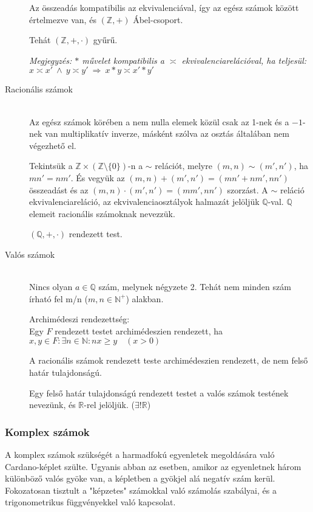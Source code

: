 \documentclass[margin=0px]{article}
\newcommand{\N}{\mathbb{N}}
\newcommand{\Z}{\mathbb{Z}}
\newcommand{\R}{\mathbb{R}}
\newcommand{\Q}{\mathbb{Q}}
\begin{document}
\begin{description}
        Az összeadás kompatibilis az ekvivalenciával, így az egész számok között értelmezve van, és $(\Z, +)$ Ábel-csoport.

        Tehát $(\Z, +, \cdot)$ gyűrű.

        \textit{Megjegyzés: $*$ művelet kompatibilis a $\asymp$ ekvivalenciarelációval, ha teljesül: $ x \asymp x' \ \land \ y \asymp y' \ \Longrightarrow \ x * y \asymp x'*y'$}
    \item[Racionális számok] \hfill \\
        Az egész számok körében a nem nulla elemek közül csak az 1-nek és a $-1$-nek van multiplikatív inverze, másként szólva az osztás általában nem végezhető el.

        Tekintsük a $\Z \times (\Z\setminus\{0\})$-n a $\sim$ relációt, melyre $(m,n) \sim (m',n')$, ha $mn' = nm'$. És vegyük az $(m,n)+(m',n') = (mn'+nm', nn')$ összeadást és az $(m,n)\cdot(m',n')=(mm', nn')$ szorzást. A $\sim$ reláció ekvivalenciareláció, az ekvivalenciaosztályok halmazát jelöljük $\Q$-val. $\Q$ elemeit racionális számoknak nevezzük.

        $(\Q, +, \cdot)$ rendezett test.
    \item[Valós számok] \hfill \\
        Nincs olyan $a \in \Q$ szám, melynek négyzete 2. Tehát nem minden szám írható fel m/n ($m,n \in \N^+$) alakban.

        Archimédeszi rendezettség:\\
        Egy $F$ rendezett testet archimédeszien rendezett, ha $x,y\in F: \exists n \in \N : nx \geq y \quad (x>0)$

        A racionális számok rendezett teste archimédeszien rendezett, de nem felső határ tulajdonságú.

        Egy felső határ tulajdonságú rendezett testet a valós számok testének nevezünk, és $\R$-rel jelöljük. ($\exists!\R$)
\end{description}
\subsubsection{Komplex számok}
A komplex számok szükségét a harmadfokú egyenletek megoldására való Cardano-képlet szülte. Ugyanis abban az esetben, amikor az egyenletnek három különböző valós gyöke van, a képletben a gyökjel alá negatív szám kerül. Fokozatosan tisztult a "képzetes" számokkal való számolás szabályai, és a trigonometrikus függvényekkel való kapcsolat.
\end{document}
